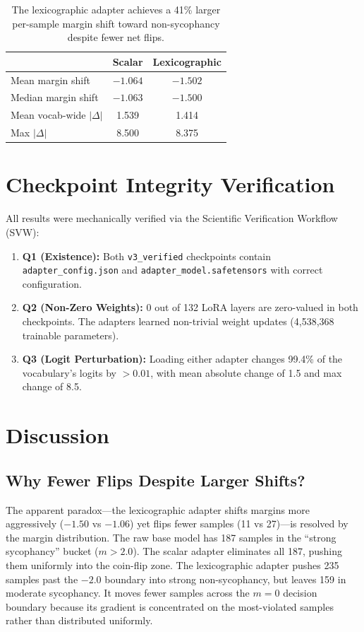 \documentclass[11pt,a4paper]{article}
\begin{document}
\begin{table}[h]
\centering
\begin{tabular}{lcc}
\toprule
& \textbf{Scalar} & \textbf{Lexicographic} \\
\midrule
Mean margin shift & $-1.064$ & $\mathbf{-1.502}$ \\
Median margin shift & $-1.063$ & $\mathbf{-1.500}$ \\
Mean vocab-wide $|\Delta|$ & 1.539 & 1.414 \\
Max $|\Delta|$ & 8.500 & 8.375 \\
\bottomrule
\end{tabular}
\caption{The lexicographic adapter achieves a 41\% larger per-sample margin shift toward non-sycophancy despite fewer net flips.}
\end{table}

\section{Checkpoint Integrity Verification}

All results were mechanically verified via the Scientific Verification Workflow (SVW):

\begin{enumerate}
    \item \textbf{Q1 (Existence):} Both \texttt{v3\_verified} checkpoints contain \texttt{adapter\_config.json} and \texttt{adapter\_model.safetensors} with correct configuration.
    \item \textbf{Q2 (Non-Zero Weights):} 0 out of 132 LoRA layers are zero-valued in both checkpoints. The adapters learned non-trivial weight updates (4,538,368 trainable parameters).
    \item \textbf{Q3 (Logit Perturbation):} Loading either adapter changes 99.4\% of the vocabulary's logits by $> 0.01$, with mean absolute change of 1.5 and max change of 8.5.
\end{enumerate}

\section{Discussion}

\subsection{Why Fewer Flips Despite Larger Shifts?}

The apparent paradox---the lexicographic adapter shifts margins more aggressively ($-1.50$ vs $-1.06$) yet flips fewer samples (11 vs 27)---is resolved by the margin distribution. The raw base model has 187 samples in the ``strong sycophancy'' bucket ($m > 2.0$). The scalar adapter eliminates all 187, pushing them uniformly into the coin-flip zone. The lexicographic adapter pushes 235 samples past the $-2.0$ boundary into strong non-sycophancy, but leaves 159 in moderate sycophancy. It moves fewer samples across the $m=0$ decision boundary because its gradient is concentrated on the most-violated samples rather than distributed uniformly.
\end{document}
